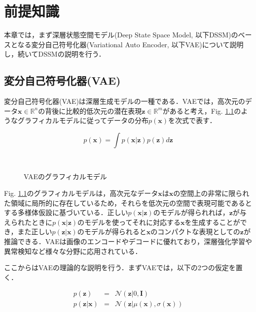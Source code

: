 \chapter{前提知識}
\label{chap:prerequisite}
本章では，まず深層状態空間モデル(Deep State Space Model, 以下DSSM)のベースとなる変分自己符号化器(Variational Auto Encoder, 以下VAE)について説明し，続いてDSSMの説明を行う．

\section{変分自己符号化器(VAE)}
\label{section:vae}
変分自己符号化器(VAE)は深層生成モデルの一種である．VAEでは，高次元のデータ$\bm{x} \in \mathbb{R}^n$の背後に比較的低次元の潜在表現$\bm{z} \in \mathbb{R}^m$があると考え，Fig. \ref{fig:vae}のようなグラフィカルモデルに従ってデータの分布$p(\bm{x})$を次式で表す．

\begin{equation}
  p(\bm{x}) = \int p(\bm{x}|\bm{z}) p(\bm{z}) d\bm{z} \label{eq:vae}
\end{equation}

\begin{figure}[tbp]
  \begin{center}
    \caption{VAEのグラフィカルモデル}
    \label{fig:vae}
　\end{center}
\end{figure}

Fig. \ref{fig:vae}のグラフィカルモデルは，高次元なデータ$\bm{x}$は$\bm{x}$の空間上の非常に限られた領域に局所的に存在しているため，それらを低次元の空間で表現可能であるとする多様体仮設に基づいている．正しい$p(\bm{x}|\bm{z})$のモデルが得られれば，$\bm{z}$が与えられたときに$p(\bm{x}|\bm{z})$のモデルを使ってそれに対応する$\bm{x}$を生成することができ，また正しい$p(\bm{z}|\bm{x})$のモデルが得られると$\bm{x}$のコンパクトな表現としての$\bm{z}$が推論できる．VAEは画像のエンコードやデコードに優れており，深層強化学習や異常検知など様々な分野に応用されている．

\vspace{\baselineskip}
ここからはVAEの理論的な説明を行う．まずVAEでは，以下の2つの仮定を置く．

\begin{eqnarray}
  p(\bm{z}) &=& \mathcal{N}(\bm{z}|0,\bm{I}) \label{eq:z}\\
  p(\bm{z}|\bm{x}) &=& \mathcal{N}(\bm{z}|\mu(\bm{x}),\sigma(\bm{x}))	\label{eq:z_cond}
\end{eqnarray}

